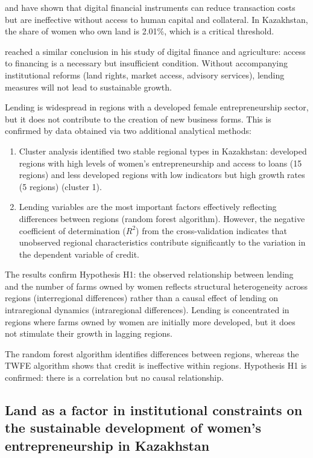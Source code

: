﻿\documentclass[pdflatex,sn-mathphys-ay]{sn-jnl}
\begin{document}
\citet{ref18} and \citet{ref56} have shown that digital
financial instruments can reduce transaction costs but are ineffective
without access to human capital and collateral. In Kazakhstan, the share
of women who own land is 2.01\%, which is a critical threshold.

\citet{ref43} reached a similar conclusion in his study of
digital finance and agriculture: access to financing is a necessary but
insufficient condition. Without accompanying institutional reforms (land
rights, market access, advisory services), lending measures will not
lead to sustainable growth.

Lending is widespread in regions with a developed female
entrepreneurship sector, but it does not contribute to the creation of
new business forms. This is confirmed by data obtained via two
additional analytical methods:

\begin{enumerate}
\item Cluster analysis identified two stable regional types in
Kazakhstan: developed regions with high levels of women's
entrepreneurship and access to loans (15 regions) and less developed
regions with low indicators but high growth rates (5 regions)
(cluster 1).

\item Lending variables are the most important factors effectively
reflecting differences between regions (random forest algorithm).
However, the negative coefficient of determination ($R^2$) from the
cross-validation indicates that unobserved regional characteristics
contribute significantly to the variation in the dependent variable of
credit.
\end{enumerate}

The results confirm Hypothesis H1: the observed relationship between
lending and the number of farms owned by women reflects structural
heterogeneity across regions (interregional differences) rather than a
causal effect of lending on intraregional dynamics (intraregional
differences). Lending is concentrated in regions where farms owned by
women are initially more developed, but it does not stimulate their
growth in lagging regions.

The random forest algorithm identifies differences between regions,
whereas the TWFE algorithm shows that credit is ineffective within
regions. Hypothesis H1 is confirmed: there is a correlation but no
causal relationship.

\subsection{Land as a factor in institutional constraints on the sustainable development of women's entrepreneurship in Kazakhstan}
\end{document}
